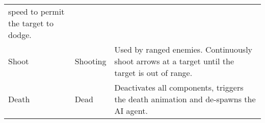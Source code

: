 \begin{table}[!ht]
\begin{center}
\begin{tabular}{ >{\small}w{l}{6em} >{\small}w{l}{7em} >{\small}m{17em} }
                                               speed to permit the target to dodge.         \\
        Shoot          & Shooting            & Used by ranged enemies. Continuously shoot 
                                               arrows at a target until the target is 
                                               out of range.                                \\
        Death          & Dead                & Deactivates all components, triggers the 
                                               death animation and de-spawns the AI agent.  \\
        \bottomrule
      \end{tabular}
    \end{center}
  \end{table}